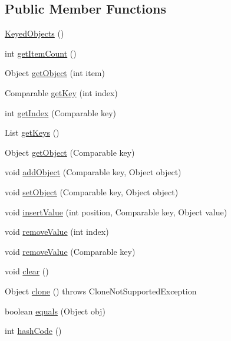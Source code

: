 \subsection*{Public Member Functions}
\begin{DoxyCompactItemize}
\item 
\mbox{\hyperlink{classorg_1_1jfree_1_1data_1_1_keyed_objects_a06f563fe73c745456393b466ea13d743}{Keyed\+Objects}} ()
\item 
int \mbox{\hyperlink{classorg_1_1jfree_1_1data_1_1_keyed_objects_a1815c9c38128966a1a51cc58ef96fb59}{get\+Item\+Count}} ()
\item 
Object \mbox{\hyperlink{classorg_1_1jfree_1_1data_1_1_keyed_objects_ac149cd342e93c780dd222b7caf6d1488}{get\+Object}} (int item)
\item 
Comparable \mbox{\hyperlink{classorg_1_1jfree_1_1data_1_1_keyed_objects_a345ba3d51a940d7e885747a0da54e04e}{get\+Key}} (int index)
\item 
int \mbox{\hyperlink{classorg_1_1jfree_1_1data_1_1_keyed_objects_af049dbf079bd3469dea36d9b62db3846}{get\+Index}} (Comparable key)
\item 
List \mbox{\hyperlink{classorg_1_1jfree_1_1data_1_1_keyed_objects_a454f023a42f3bc6ca0cc6aff5439004d}{get\+Keys}} ()
\item 
Object \mbox{\hyperlink{classorg_1_1jfree_1_1data_1_1_keyed_objects_aad4f61f3e7f311960cf0064b8d304155}{get\+Object}} (Comparable key)
\item 
void \mbox{\hyperlink{classorg_1_1jfree_1_1data_1_1_keyed_objects_a6a48961294a54e5a2d1c64489ab52cf6}{add\+Object}} (Comparable key, Object object)
\item 
void \mbox{\hyperlink{classorg_1_1jfree_1_1data_1_1_keyed_objects_aeb12f4c31d2ec23d2dda75a114e7813c}{set\+Object}} (Comparable key, Object object)
\item 
void \mbox{\hyperlink{classorg_1_1jfree_1_1data_1_1_keyed_objects_a2f886920d582d6a38dbd1006e0b5b6b5}{insert\+Value}} (int position, Comparable key, Object value)
\item 
void \mbox{\hyperlink{classorg_1_1jfree_1_1data_1_1_keyed_objects_af0370d9fe51c22aca2b3e429983069c0}{remove\+Value}} (int index)
\item 
void \mbox{\hyperlink{classorg_1_1jfree_1_1data_1_1_keyed_objects_af180842c9a65ae9255d1996c71ae9da7}{remove\+Value}} (Comparable key)
\item 
void \mbox{\hyperlink{classorg_1_1jfree_1_1data_1_1_keyed_objects_aa01897f6cefde8c7f490c710fb8977f3}{clear}} ()
\item 
Object \mbox{\hyperlink{classorg_1_1jfree_1_1data_1_1_keyed_objects_a657f87b7af08a384f56765840f59d44b}{clone}} ()  throws Clone\+Not\+Supported\+Exception 
\item 
boolean \mbox{\hyperlink{classorg_1_1jfree_1_1data_1_1_keyed_objects_a53eed765d0a4a6ab604185fd3f4fa749}{equals}} (Object obj)
\item 
int \mbox{\hyperlink{classorg_1_1jfree_1_1data_1_1_keyed_objects_a394658c975b404e9527f90ed2c352176}{hash\+Code}} ()
\end{DoxyCompactItemize}


